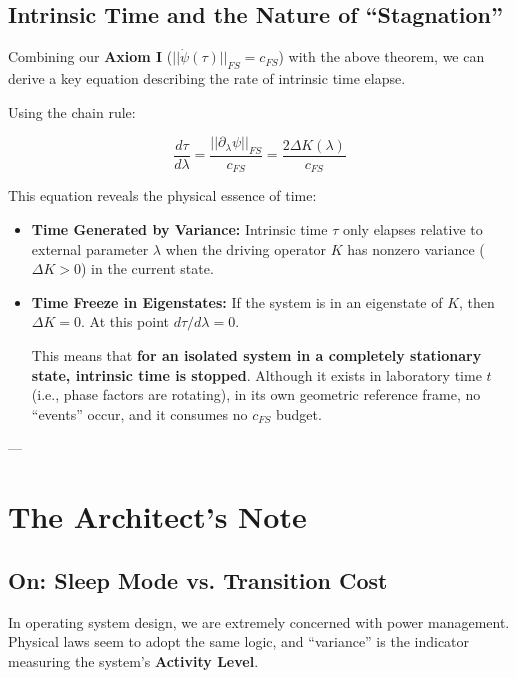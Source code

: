 \subsection{Intrinsic Time and the Nature of ``Stagnation''}

Combining our \textbf{Axiom I} (\textbf{$||\dot{\psi}(\tau)||_{FS} = c_{FS}$}) with the above theorem, we can derive a key equation describing the rate of intrinsic time elapse.

Using the chain rule:

$$\frac{d\tau}{d\lambda} = \frac{||\partial_{\lambda}\psi||_{FS}}{c_{FS}} = \frac{2\Delta K(\lambda)}{c_{FS}}$$

This equation reveals the physical essence of time:

\begin{itemize}
\item \textbf{Time Generated by Variance:} Intrinsic time \textbf{$\tau$} only elapses relative to external parameter \textbf{$\lambda$} when the driving operator \textbf{$K$} has nonzero variance (\textbf{$\Delta K > 0$}) in the current state.

\item \textbf{Time Freeze in Eigenstates:} If the system is in an eigenstate of \textbf{$K$}, then \textbf{$\Delta K = 0$}. At this point \textbf{$d\tau/d\lambda = 0$}.

   This means that \textbf{for an isolated system in a completely stationary state, intrinsic time is stopped}. Although it exists in laboratory time \textbf{$t$} (i.e., phase factors are rotating), in its own geometric reference frame, no ``events'' occur, and it consumes no \textbf{$c_{FS}$} budget.
\end{itemize}

---

\section{The Architect's Note}

\subsection{On: Sleep Mode vs. Transition Cost}

In operating system design, we are extremely concerned with power management. Physical laws seem to adopt the same logic, and ``variance'' is the indicator measuring the system's \textbf{Activity Level}.

